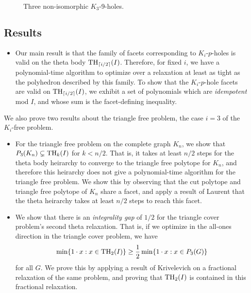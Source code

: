 \begin{figure}[htd]
	\caption{Three non-isomorphic $K_3$-9-holes.}
	\label{chap1:9holeintro}
\end{figure}

\subsection{Results}
\begin{itemize}
\item Our main result is that the family of facets corresponding to $K_i$-$p$-holes is valid on the theta body $\textup{TH}_{\lceil i/2\rceil }(I)$.
Therefore, for fixed $i$, we have a polynomial-time algorithm to optimize over a relaxation at least as tight as the polyhedron described by this family. 
To show that the $K_i$-$p$-hole facets are valid on $\textup{TH}_{\lceil i/2\rceil}(I)$, we exhibit a set of  polynomials which are {\em idempotent} mod $I$, and whose sum is the facet-defining inequality.
\end{itemize}
We also prove two results about the triangle free problem, the case $i=3$ of the $K_i$-free problem.
\begin{itemize}
\item For the triangle free problem on the complete graph $K_n$, we show that $P_3(K_n) \subsetneq \textup{TH}_{k}(I)$ for $k < n/2$.
That is, it takes at least $n/2$ steps for the theta body heirarchy to converge to the triangle free polytope for $K_n$, and therefore this heirarchy does not give a polynomial-time algorithm for the triangle free problem.
We show this by observing that the cut polytope and triangle free polytope of $K_n$ share a facet, and apply a result of Laurent \cite{moniquestuff} that the theta heirarchy takes at least $n/2$ steps to reach this facet.
\item We show that there is an {\em integrality gap} of $1/2$ for the triangle cover problem's second theta relaxation. 
That is, if we optimize in the all-ones direction in the triangle cover problem, we have 
$$\min \{1 \cdot x: x \in \textup{TH}_2(I) \} \ge \frac{1}{2} \min \{1 \cdot x: x \in P_3(G)\}$$
for all $G$. 
We prove this by applying a result of Krivelevich \cite{krivelevich} on a fractional relaxation of the same problem, and proving that $\textup{TH}_2(I)$ is contained in this fractional relaxation.
\end{itemize}
